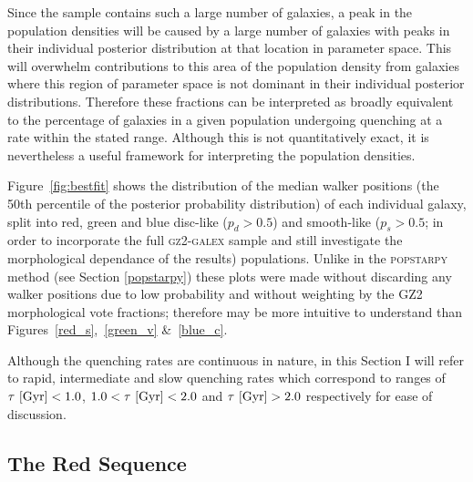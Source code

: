Since the sample contains such a large number of galaxies, a peak in the population densities will be caused by a large number of galaxies with peaks in their individual posterior distribution at that location in parameter space. This will overwhelm contributions to this area of the population density from galaxies where this region of parameter space is not dominant in their individual posterior distributions. Therefore these fractions can be interpreted as broadly equivalent to the percentage of galaxies in a given population undergoing quenching at a rate within the stated range. Although this is not quantitatively exact, it is nevertheless a useful framework for interpreting the population densities.

Figure~\ref{fig:bestfit} shows the distribution of the median walker positions (the 50th percentile of the posterior probability distribution) of each individual galaxy, split into red, green and blue disc-like ($p_d > 0.5$) and smooth-like ($p_s > 0.5$; in order to incorporate the full \textsc{gz2-galex} sample and still investigate the morphological dependance of the results) populations. Unlike in the \textsc{popstarpy} method (see Section \ref{popstarpy}) these plots were made without discarding any walker positions due to low probability and without weighting by the GZ2 morphological vote fractions; therefore may be more intuitive to understand than Figures~\ref{red_s},~\ref{green_v} \&~\ref{blue_c}.

Although the quenching rates are continuous in nature, in this Section I will refer to rapid, intermediate and slow quenching rates which correspond to ranges of  $\tau ~\rm{[Gyr]} < 1.0$, $1.0 < \tau ~\rm{[Gyr]} < 2.0$ and $\tau ~\rm{[Gyr]} > 2.0$ respectively for ease of discussion.



\subsection{The Red Sequence}\label{rs}

